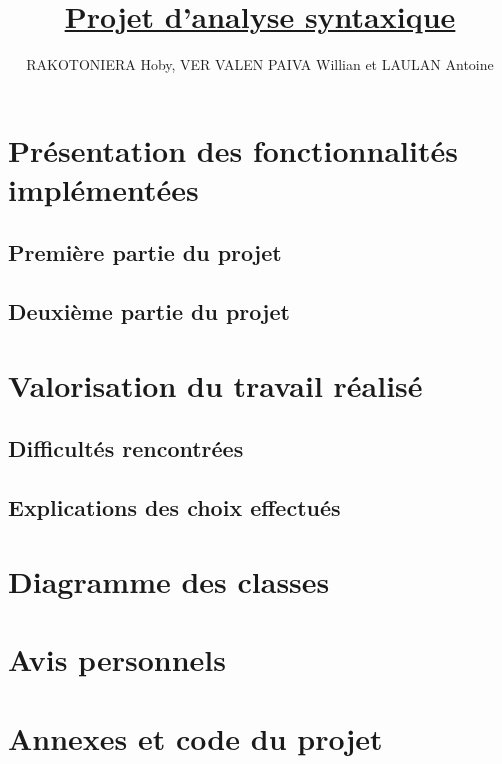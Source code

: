 \documentclass[12pt,a4paper]{article}
\begin{document}
\title{ \href{https://github.com/WillianPaiva/project_AS}{\textbf{Projet d'analyse syntaxique}}}
\author{RAKOTONIERA Hoby, VER VALEN PAIVA Willian et LAULAN Antoine}

 
\maketitle
\newpage
\tableofcontents
\newpage

\section{Présentation des fonctionnalités implémentées}

\subsection{Première partie du projet}

\subsection{Deuxième partie du projet}



\section{Valorisation du travail réalisé}

\subsection{Difficultés rencontrées}

\subsection{Explications des choix effectués}


\section{Diagramme des classes}


\section{Avis personnels}


\section{Annexes et code du projet}
\end{document}
